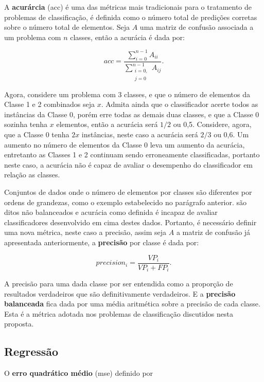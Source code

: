 A {\bf acurárcia} (acc) é uma das métricas mais tradicionais para o tratamento de problemas de classificação, é definida como o número total de predições corretas sobre o número total de elementos. Seja $A$ uma matriz de confusão associada a um problema com $n$ classes, então a acurácia é dada por:

\begin{equation}
acc=\frac{\sum_{i=0}^{n-1}A_{ii}}{\sum_{\substack{i=0,\\j=0}}^{n-1}A_{ij}}\mbox{.}
\end{equation}

Agora, considere um problema com 3 classes, e que o número de elementos da Classe 1 e 2 combinados seja $x$. Admita ainda que o classificador acerte todos as instâncias da Classe 0, porém erre todas as demais duas classes, e que a Classe 0 sozinha tenha $x$ elementos, então a acurácia será $1/2$ ou 0,5. Considere, agora, que a Classe 0 tenha $2x$ instâncias, neste caso a acurácia será $2/3$ ou 0,6. Um aumento no número de elementos da Classe 0 leva um aumento da acurácia, entretanto as Classes 1 e 2 continuam sendo erroneamente classificadas, portanto neste caso, a acurácia não é capaz de avaliar o desempenho do classificador em relação as classes.

Conjuntos de dados onde o número de elementos por classes são diferentes por ordens de grandezas, como o exemplo estabelecido no parágrafo anterior. são ditos não balanceados e acurácia como definida é incapaz de avaliar classificadores desenvolvido em cima destes dados. Portanto, é necessário definir uma nova métrica, neste caso a precisão, assim seja $A$ a matriz de confusão já apresentada anteriormente, a {\bf precisão} por classe é dada por:

\begin{equation}
precision_i=\frac{VP_i}{VP_i+FP_i}\mbox{.}
\end{equation}

A precisão para uma dada classe por ser entendida como a proporção de resultados verdadeiros que são definitivamente verdadeiros. E a {\bf precisão balanceada} fica dada por uma média aritmética sobre a precisão de cada classe. Esta é a métrica adotada nos problemas de classificação discutidos nesta proposta.

\subsection{Regressão}

O {\bf erro quadrático médio} (mse) definido por

